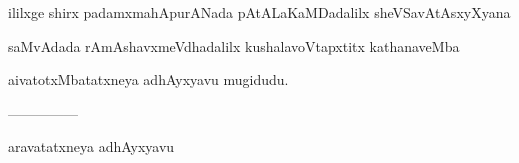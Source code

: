 \documentclass{article}
\begin{document}
\begin{center}
ililxge shirx padamxmahApurANada pAtALaKaMDadalilx sheVSavAtAsxyXyana
\end{center}

\begin{center}
saMvAdada rAmAshavxmeVdhadalilx kushalavoVtapxtitx kathanaveMba
\end{center}

\begin{center}
aivatotxMbatatxneya adhAyxyavu mugidudu.
\end{center}

\begin{center}
---------------
\end{center}

\begin{center}
aravatatxneya adhAyxyavu
\end{center}
\end{document}
